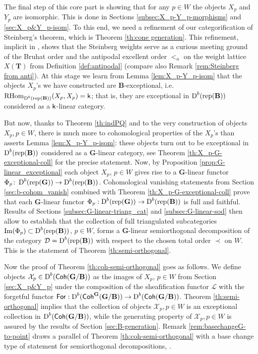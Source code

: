 \documentclass[sn-mathphys-num]{sn-jnl}%
\newcommand{\tX}{{\mathcal X}}
\newcommand{\Ll}{\mathcal L}
\newcommand{\D}{\mathcal D}
\newcommand{\rep}{{\mathrm{rep}}}
\newcommand*{\Dd}{\mathop{\mathrm D\kern0pt}\nolimits}
\newcommand*{\RHom}{\mathop{\mathrm {RHom}}\nolimits}
\newcommand*{\Coh}{\mathop{\sf {Coh}}\nolimits}
\newcommand{\sk}{{\sf k}}
\newcommand{\bg}{\mathbf G}
\newcommand{\fb}{\mathbf B}
\newcommand{\bt}{\mathbf T}
\theoremstyle{definition}
\begin{document}
The final step of this core part is showing that for any $p\in W$ the objects $X_p$ and $Y_p$ are isomorphic. This is done in Sections \ref{subsec:X_p-Y_p-morphisms} and \ref{sec:X_p&Y_p-isom}. To this end, we need a refinement of our categorification of Steinberg's theorem, which is Theorem \ref{th:cone generation}. This refinement, implicit in \cite{Ana}, shows that the Steinberg weights serve as a curious meeting ground of the Bruhat order and the antipodal excellent order $<_a$ on the weight lattice $X(\bt)$ from Definition \ref{def:antipodal} (compare also Remark \ref{rem:Steinberg from anti}). At this stage we learn from Lemma \ref{lem:X_p-Y_p-isom} that the objects $X_p$'s we have constructed are $\fb$-exceptional, i.e. $\RHom _{\Dd^b(\rep(\fb))}(X_p,X_p)=\sk$; that is, they are exceptional in $\Dd ^b(\rep( \fb))$ considered as a $\sf k$-linear category.

But now, thanks to Theorem \ref{th:indPQ} and to the very construction of objects $X_p, p\in W$, there is much more to cohomological properties of the $X_p$'s than asserts Lemma \ref{lem:X_p-Y_p-isom}: these objects turn out to be exceptional in $\Dd ^b(\rep( \fb))$ considered as a $\bg$-linear category, see Theorem \ref{th:X_p-G-exceptional-coll} for the precise statement. Now, by Proposition \ref{prop:G-linear_exceptional}
each object $X_p$, $p\in W$ gives rise to a $ \bg$-linear functor 
$\Phi _p\colon \Dd^b(\rep ( \bg))\rightarrow \Dd^b(\rep(\fb))$. 
Cohomological vanishing statements from Section \ref{sec:b-cohom_vanish} combined with Theorem \ref{th:X_p-G-exceptional-coll} prove that each $ \bg$-linear functor $\Phi _p:\Dd^b(\rep ( \bg))\rightarrow \Dd^b(\rep(\fb))$ is full and faithful. 
Results of Sections \ref{subsec:G-linear-triang_cat} and \ref{subsec:G-linear-sod} then allow to establish that the collection of full triangulated subcategories ${\rm Im}(\Phi _p)\subset \Dd^b(\rep(\fb))$, $p\in W$, forms a $ \bg$-linear semiorthogonal decomposition of the 
category $\D= \Dd^b(\rep(\fb))$ with respect to the {chosen} total order $\prec$ on $W$. 
This is the statement of Theorem \ref{th:semi-orthogonal}.


Now the proof of Theorem \ref{th:coh-semi-orthogonal} goes as follows.
We define objects $\tX_p\in \Dd^b(\Coh ( \bg/ \fb))$ as the images of $X_p$, $p\in W$ from Section \ref{sec:X_p&Y_p} under the composition of the sheafification functor $\Ll$ with the forgetful functor ${\sf For}:{\Dd ^b}(\Coh ^{ \bg}( \bg/ \fb))\rightarrow \Dd^b(\Coh ( \bg/ \fb))$. 
Theorem \ref{th:semi-orthogonal} implies that the collection of objects $\tX_p, p\in W$ is an exceptional collection in $\Dd^b(\Coh ( \bg/ \fb))$, while the generating property of $\tX_p, p\in W$ is assured by the results of Section \ref{sec:B-generation}. Remark \ref{rem:basechangeG-to-point} draws a parallel of Theorem \ref{th:coh-semi-orthogonal} with a base change type of statement for semiorthogonal decompositions, \cite{Kuzbasech}.
\end{document}
